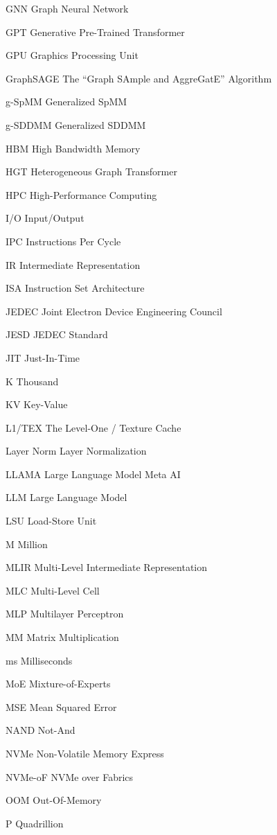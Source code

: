 \begin{symbollist*}
\item[GNN] Graph Neural Network
\item[GPT] Generative Pre-Trained Transformer
\item[GPU] Graphics Processing Unit
\item[GraphSAGE] The ``Graph SAmple and AggreGatE'' Algorithm
\item[g-SpMM] Generalized SpMM
\item[g-SDDMM] Generalized SDDMM
\item[HBM] High Bandwidth Memory
\item[HGT] Heterogeneous Graph Transformer
\item[HPC] High-Performance Computing
\item[I/O] Input/Output
\item[IPC] Instructions Per Cycle
\item[IR] Intermediate Representation
\item[ISA] Instruction Set Architecture
\item[JEDEC] Joint Electron Device Engineering Council
\item[JESD] JEDEC Standard
\item[JIT] Just-In-Time
\item[K] Thousand
\item[KV] Key-Value
\item[L1/TEX] The Level-One / Texture Cache
\item[Layer Norm] Layer Normalization
\item[LLAMA] Large Language Model Meta AI
\item[LLM] Large Language Model
\item[LSU] Load-Store Unit
\item[M] Million
\item[MLIR] Multi-Level Intermediate Representation
\item[MLC] Multi-Level Cell
\item[MLP] Multilayer Perceptron
\item[MM] Matrix Multiplication
\item[ms] Milliseconds
\item[MoE] Mixture-of-Experts
\item[MSE] Mean Squared Error
\item[NAND] Not-And
\item[NVMe] Non-Volatile Memory Express
\item[NVMe-oF] NVMe over Fabrics
\item[OOM] Out-Of-Memory
\item[P] Quadrillion

\end{symbollist*}
